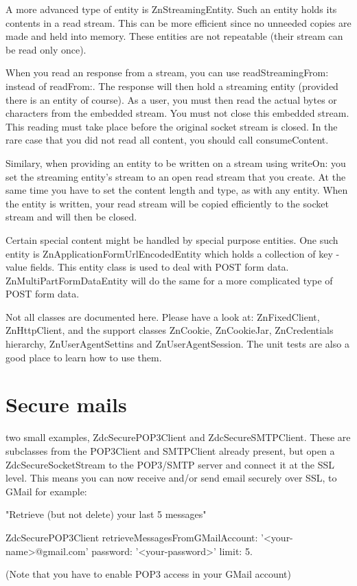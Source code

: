 \documentclass[a4paper,10pt,twoside]{book}
\begin{document}
A more advanced type of entity is ZnStreamingEntity. Such an entity holds its contents in a read stream. This can be more efficient since no unneeded copies are made and held into memory. These entities are not repeatable (their stream can be read only once).

When you read an response from a stream, you can use  readStreamingFrom: instead of  readFrom:. The response will then hold a streaming entity (provided there is an entity of course). As a user, you must then read the actual bytes or characters from the embedded stream. You must not close this embedded stream. This reading must take place before the original socket stream is closed. In the rare case that you did not read all content, you should call  consumeContent.

Similary, when providing an entity to be written on a stream using  writeOn: you set the streaming entity's stream to an open read stream that you create. At the same time you have to set the content length and type, as with any entity. When the entity is written, your read stream will be copied efficiently to the socket stream and will then be closed.

Certain special content might be handled by special purpose entities. One such entity is ZnApplicationFormUrlEncodedEntity which holds a collection of key - value fields. This entity class is used to deal with POST form data. ZnMultiPartFormDataEntity will do the same for a more complicated type of POST form data.

Not all classes are documented here. Please have a look at: ZnFixedClient, ZnHttpClient, and the support classes ZnCookie, ZnCookieJar, ZnCredentials hierarchy, ZnUserAgentSettins and ZnUserAgentSession. The unit tests are also a good place to learn how to use them.



\section{Secure mails}
 two small examples, ZdcSecurePOP3Client and ZdcSecureSMTPClient. These are subclasses from the POP3Client and SMTPClient already present, but open a ZdcSecureSocketStream to the POP3/SMTP server and connect it at the SSL level. This means you can now receive and/or send email securely over SSL, to GMail for example:

"Retrieve (but not delete) your last 5 messages"

\begin{code}{}
ZdcSecurePOP3Client
	retrieveMessagesFromGMailAccount: '<your-name>@gmail.com'
	password: '<your-password>'
	limit: 5.
\end{code}
(Note that you have to enable POP3 access in your GMail account)
\end{document}
